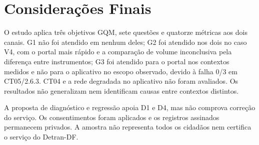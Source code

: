 \section{Considerações Finais}
\label{sec:consideracoes-finais}

O estudo aplica três objetivos GQM, sete questões e quatorze métricas aos dois canais. G1 não foi atendido em nenhum deles; G2 foi atendido nos dois no caso V4, com o portal mais rápido e a comparação de volume inconclusiva pela diferença entre instrumentos; G3 foi atendido para o portal nos contextos medidos e não para o aplicativo no escopo observado, devido à falha 0/3 em CT05/2.6.3. CT04 e a rede degradada no aplicativo não foram avaliados. Os resultados não generalizam nem identificam causas entre contextos distintos.

A proposta de diagnóstico e regressão apoia D1 e D4, mas não comprova correção do serviço. Os consentimentos foram aplicados e os registros assinados permanecem privados. A amostra não representa todos os cidadãos nem certifica o serviço do Detran-DF.
